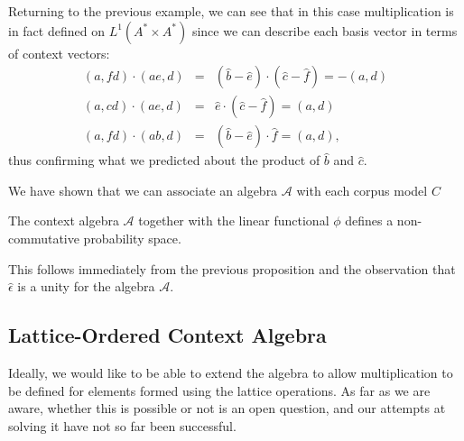 \documentclass[11pt]{report}
\begin{document}

Returning to the previous example, we can see that in this case multiplication is in fact defined on $L^1(A^*\times A^*)$ since we can describe each basis vector in terms of context vectors:
\begin{eqnarray*}
(a,fd)\cdot(ae,d) &=& (\hat{b} - \hat{e})\cdot(\hat{c} - \hat{f}) = -(a,d)\\
(a,cd)\cdot(ae,d) &=& \hat{e}\cdot(\hat{c} - \hat{f}) = (a,d)\\
(a,fd)\cdot(ab,d) &=& (\hat{b} - \hat{e})\cdot\hat{f} = (a,d),
\end{eqnarray*}
thus confirming what we predicted about the product of $\hat{b}$ and $\hat{c}$.

We have shown that we can associate an algebra $\mathcal{A}$ with each corpus model $C$

\begin{prop}
The context algebra $\mathcal{A}$ together with the linear functional $\phi$ defines a non-commutative probability space.
\end{prop}

This follows immediately from the previous proposition and the observation that $\hat{\epsilon}$ is a unity for the algebra $\mathcal{A}$.



\subsection{Lattice-Ordered Context Algebra}

Ideally, we would like to be able to extend the algebra to allow multiplication to be defined for elements formed using the lattice operations. As far as we are aware, whether this is possible or not is an open question, and our attempts at solving it have not so far been successful.



\end{document}
